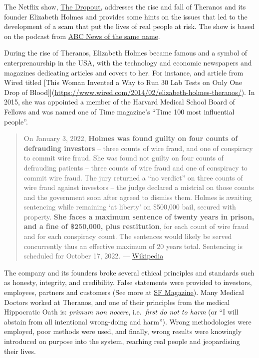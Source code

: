 \documentclass[
]{book}
\begin{document}
The Netflix show, \href{https://www.theguardian.com/tv-and-radio/2022/mar/09/how-theranos-drama-the-dropout-gets-scam-and-tech-culture-right}{The Dropout}, addresses the rise and fall of Theranos and its founder Elizabeth Holmes and provides some hints on the issues that led to the development of a scam that put the lives of real people at risk. The show is based on the podcast from \href{https://abcaudio.com/podcasts/the-dropout/}{ABC News of the same name}.

During the rise of Theranos, Elizabeth Holmes became famous and a symbol of enterprenaurship in the USA, with the technology and economic newspapers and magazines dedicating articles and covers to her. For instance, and article from Wired titled {[}This Woman Invented a Way to Run 30 Lab Tests on Only One Drop of Blood{]}{]}(\url{https://www.wired.com/2014/02/elizabeth-holmes-theranos/}). In 2015, she was appointed a member of the Harvard Medical School Board of Fellows and was named one of Time magazine's ``Time 100 most influential people''.

\begin{quote}
On January 3, 2022, \textbf{Holmes was found guilty on four counts of defrauding investors} -- three counts of wire fraud, and one of conspiracy to commit wire fraud. She was found not guilty on four counts of defrauding patients -- three counts of wire fraud and one of conspiracy to commit wire fraud. The jury returned a ``no verdict'' on three counts of wire fraud against investors -- the judge declared a mistrial on those counts and the government soon after agreed to dismiss them. Holmes is awaiting sentencing while remaining `at liberty' on \$500,000 bail, secured with property. \textbf{She faces a maximum sentence of twenty years in prison, and a fine of \$250,000, plus restitution}, for each count of wire fraud and for each conspiracy count. The sentences would likely be served concurrently thus an effective maximum of 20 years total. Sentencing is scheduled for October 17, 2022. --- \href{https://en.wikipedia.org/wiki/Elizabeth_Holmes\#U.S._v._Holmes,_et_al.}{Wikipedia}
\end{quote}

The company and its founders broke several ethical principles and standards such as honesty, integrity, and credibility. False statements were provided to investors, employees, partners and customers (See more at \href{https://sfmagazine.com/post-entry/june-2022-theranos-cautionary-tale-of-ethical-failings/}{SF Magazine}). Many Medical Doctors worked at Theranos, and one of their principles from the medical Hippocratic Oath is: \emph{primum non nocere}, i.e.~\emph{first do not to harm} (or ``I will abstain from all intentional wrong-doing and harm''). Wrong methodologies were employed, poor methods were used, and finally, wrong results were knowingly introduced on purpose into the system, reaching real people and jeopardising their lives.
\end{document}
